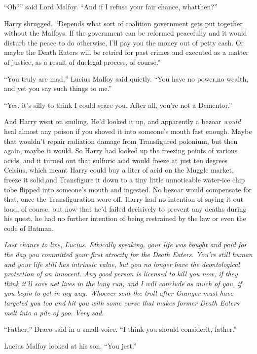 ``Oh?'' said Lord Malfoy. ``And if I refuse your fair chance, whatthen?''

Harry shrugged. ``Depends what sort of coalition government gets put together without the Malfoys. If the government can be reformed peacefully and it would disturb the peace to do otherwise, I'll pay you the money out of petty cash. Or maybe the Death Eaters will be retried for past crimes and executed as a matter of justice, as a result of duelegal process, of course.''

``You truly are mad,'' Lucius Malfoy said quietly. ``You have no power,no wealth, and yet you say such things to me.''

``Yes, it's silly to think I could scare you. After all, you're not a Dementor.''

And Harry went on smiling. He'd looked it up, and apparently a bezoar \emph{would} heal almost any poison if you shoved it into someone's mouth fast enough. Maybe that wouldn't repair radiation damage from Transfigured polonium, but then again, maybe it would. So Harry had looked up the freezing points of various acids, and it turned out that sulfuric acid would freeze at just ten degrees Celsius, which meant Harry could buy a liter of acid on the Muggle market, freeze it solid,and Transfigure it down to a tiny little unnoticable water-ice chip tobe flipped into someone's mouth and ingested. No bezoar would compensate for that, once the Transfiguration wore off. Harry had no intention of saying it out loud, of course, but now that he'd failed decisively to prevent any deaths during his quest, he had no further intention of being restrained by the law or even the code of Batman.

\emph{Last chance to live, Lucius. Ethically speaking, your life was bought and paid for the day you committed your first atrocity for the Death Eaters. You're still human and your life still has intrinsic value, but you no longer have the deontological protection of an innocent. Any good person is licensed to kill you now, if they think it'll save net lives in the long run; and I will conclude as much of you, if you begin to get in my way. Whoever sent the troll after Granger must have targeted you too and hit you with some curse that makes former Death Eaters melt into a pile of goo. Very sad.}

``Father,'' Draco said in a small voice. ``I think you should considerit, father.''

Lucius Malfoy looked at his son. ``You jest.''

